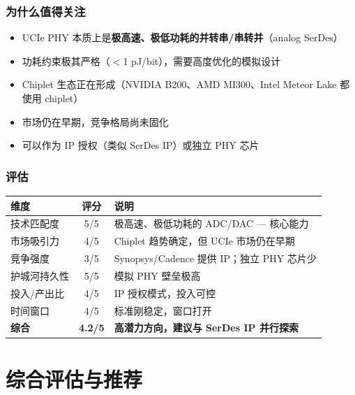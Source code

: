 \documentclass[11pt,a4paper]{ctexart}
\begin{document}
\subsubsection{为什么值得关注}

\begin{itemize}
    \item UCIe PHY 本质上是\textbf{极高速、极低功耗的并转串/串转并}（analog SerDes）
    \item 功耗约束极其严格（$<$1 pJ/bit），需要高度优化的模拟设计
    \item Chiplet 生态正在形成（NVIDIA B200、AMD MI300、Intel Meteor Lake 都使用 chiplet）
    \item 市场仍在早期，竞争格局尚未固化
    \item 可以作为 IP 授权（类似 SerDes IP）或独立 PHY 芯片
\end{itemize}

\subsubsection{评估}

\begin{table}[htb]
    \centering
    \begin{tabular}{l c p{}}
        \toprule
        \textbf{维度} & \textbf{评分} & \textbf{说明} \\
        \midrule
        技术匹配度 & 5/5 & 极高速、极低功耗的 ADC/DAC — 核心能力 \\
        市场吸引力 & 4/5 & Chiplet 趋势确定，但 UCIe 市场仍在早期 \\
        竞争强度 & 3/5 & Synopsys/Cadence 提供 IP；独立 PHY 芯片少 \\
        护城河持久性 & 5/5 & 模拟 PHY 壁垒极高 \\
        投入/产出比 & 4/5 & IP 授权模式，投入可控 \\
        时间窗口 & 4/5 & 标准刚稳定，窗口打开 \\
        \midrule
        \rowcolor{strong}
        \textbf{综合} & \textbf{4.2/5} & \textbf{高潜力方向，建议与 SerDes IP 并行探索} \\
        \bottomrule
    \end{tabular}
\end{table}

\section{综合评估与推荐}
\end{document}
